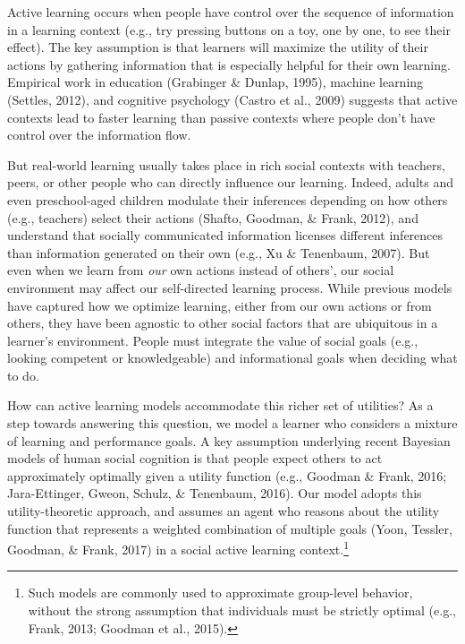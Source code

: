 \documentclass[10pt, letterpaper]{article}
\begin{document}
Active learning occurs when people have control over the sequence of
information in a learning context (e.g., try pressing buttons on a toy,
one by one, to see their effect). The key assumption is that learners
will maximize the utility of their actions by gathering information that
is especially helpful for their own learning. Empirical work in
education (Grabinger \& Dunlap, 1995), machine learning (Settles, 2012),
and cognitive psychology (Castro et al., 2009) suggests that active
contexts lead to faster learning than passive contexts where people
don't have control over the information flow.

But real-world learning usually takes place in rich social contexts with
teachers, peers, or other people who can directly influence our
learning. Indeed, adults and even preschool-aged children modulate their
inferences depending on how others (e.g., teachers) select their actions
(Shafto, Goodman, \& Frank, 2012), and understand that socially
communicated information licenses different inferences than information
generated on their own (e.g., Xu \& Tenenbaum, 2007). But even when we
learn from \emph{our} own actions instead of others', our social
environment may affect our self-directed learning process. While
previous models have captured how we optimize learning, either from our
own actions or from others, they have been agnostic to other social
factors that are ubiquitous in a learner's environment. People must
integrate the value of social goals (e.g., looking competent or
knowledgeable) and informational goals when deciding what to do.

How can active learning models accommodate this richer set of utilities?
As a step towards answering this question, we model a learner who
considers a mixture of learning and performance goals. A key assumption
underlying recent Bayesian models of human social cognition is that
people expect others to act approximately optimally given a utility
function (e.g., Goodman \& Frank, 2016; Jara-Ettinger, Gweon, Schulz, \&
Tenenbaum, 2016). Our model adopts this utility-theoretic approach, and
assumes an agent who reasons about the utility function that represents
a weighted combination of multiple goals (Yoon, Tessler, Goodman, \&
Frank, 2017) in a social active learning context.\footnote{Such models
  are commonly used to approximate group-level behavior, without the
  strong assumption that individuals must be strictly optimal (e.g.,
  Frank, 2013; Goodman et al., 2015).}
\end{document}
